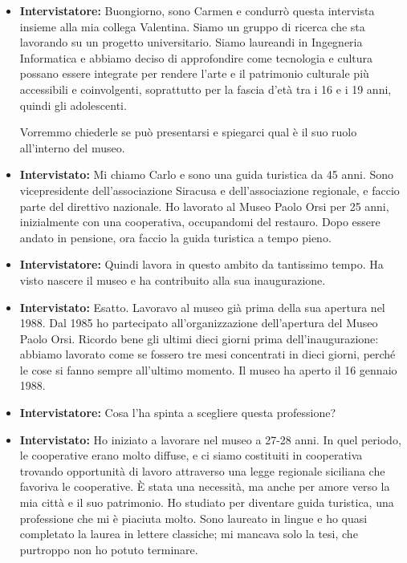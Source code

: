 \documentclass{article}
\begin{document}
\begin{itemize}
    \item \textbf{Intervistatore:} Buongiorno, sono Carmen e condurrò questa intervista insieme alla mia collega Valentina. Siamo un gruppo di ricerca che sta lavorando su un progetto universitario. Siamo laureandi in Ingegneria Informatica e abbiamo deciso di approfondire come tecnologia e cultura possano essere integrate per rendere l'arte e il patrimonio culturale più accessibili e coinvolgenti, soprattutto per la fascia d'età tra i 16 e i 19 anni, quindi gli adolescenti.
    
    Vorremmo chiederle se può presentarsi e spiegarci qual è il suo ruolo all’interno del museo.
    
    \item \textbf{Intervistato:} Mi chiamo Carlo e sono una guida turistica da 45 anni. Sono vicepresidente dell’associazione Siracusa e dell’associazione regionale, e faccio parte del direttivo nazionale. Ho lavorato al Museo Paolo Orsi per 25 anni, inizialmente con una cooperativa, occupandomi del restauro. Dopo essere andato in pensione, ora faccio la guida turistica a tempo pieno.
    
    \item \textbf{Intervistatore:} Quindi lavora in questo ambito da tantissimo tempo. Ha visto nascere il museo e ha contribuito alla sua inaugurazione.
    
    \item \textbf{Intervistato:} Esatto. Lavoravo al museo già prima della sua apertura nel 1988. Dal 1985 ho partecipato all’organizzazione dell’apertura del Museo Paolo Orsi. Ricordo bene gli ultimi dieci giorni prima dell’inaugurazione: abbiamo lavorato come se fossero tre mesi concentrati in dieci giorni, perché le cose si fanno sempre all’ultimo momento. Il museo ha aperto il 16 gennaio 1988.
    
    \item \textbf{Intervistatore:} Cosa l’ha spinta a scegliere questa professione?
    
    \item \textbf{Intervistato:} Ho iniziato a lavorare nel museo a 27-28 anni. In quel periodo, le cooperative erano molto diffuse, e ci siamo costituiti in cooperativa trovando opportunità di lavoro attraverso una legge regionale siciliana che favoriva le cooperative. È stata una necessità, ma anche per amore verso la mia città e il suo patrimonio. Ho studiato per diventare guida turistica, una professione che mi è piaciuta molto. Sono laureato in lingue e ho quasi completato la laurea in lettere classiche; mi mancava solo la tesi, che purtroppo non ho potuto terminare.
    

\end{itemize}
\end{document}
